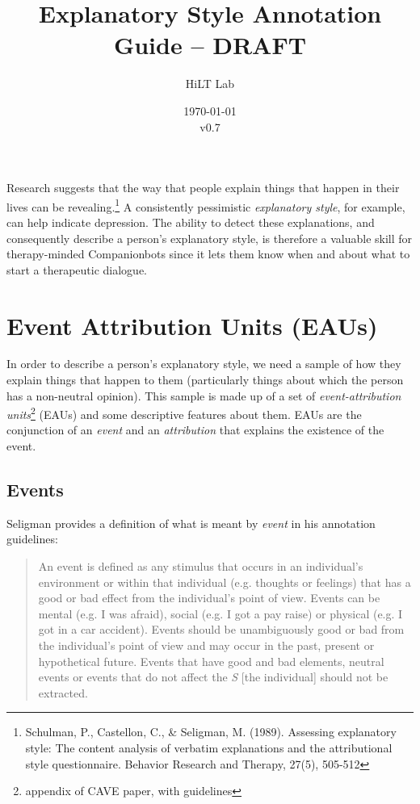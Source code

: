 \documentclass[a4paper,12pt]{article}
\begin{document}
\title{Explanatory Style Annotation Guide -- DRAFT}
\author{HiLT Lab}
\date{\today\\v0.7}
\maketitle

\tableofcontents
\break

Research suggests that the way that people explain things that happen in their lives can be revealing.\footnote{\label{seligman89}Schulman, P., Castellon, C., \& Seligman, M. (1989). Assessing explanatory style: The content analysis of verbatim explanations and the attributional style questionnaire. Behavior Research and Therapy, 27(5), 505-512} %
A consistently pessimistic \emph{explanatory style}, for example, can help indicate depression.
The ability to detect these explanations, and consequently describe a person's explanatory style, is therefore a valuable skill for therapy-minded Companionbots since it lets them know when and about what to start a therapeutic dialogue.

\section{Event Attribution Units (EAUs)}
In order to describe a person's explanatory style, we need a sample of how they explain things that happen to them (particularly things about which the person has a non-neutral opinion). %
This sample is made up of a set of \emph{event-attribution units}\footnote{\label{CAVE}appendix of CAVE paper, with guidelines} (EAUs) and some descriptive features about them. %
EAUs are the conjunction of an \emph{event} and an \emph{attribution} that explains the existence of the event.


\subsection{Events}

Seligman provides a definition of what is meant by \emph{event} in his annotation guidelines: %

\begin{quote}
    An event is defined as any stimulus that occurs in an individual's environment or within that individual (e.g. thoughts or feelings) that has a good or bad effect from the individual's point of view.
    Events can be mental (e.g. I was afraid), social (e.g. I got a pay raise) or physical (e.g. I got in a car accident).
    Events should be unambiguously good or bad from the individual's point of view and may occur in the past, present or hypothetical future.
    Events that have good and bad elements, neutral events or events that do not affect the \emph{S} [the individual] should not be extracted.
\end{quote}
\end{document}
